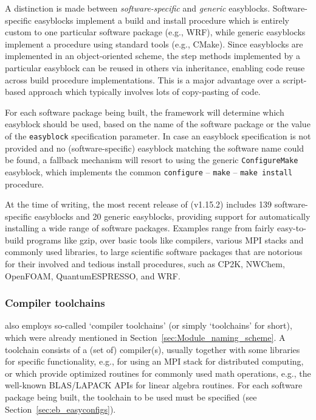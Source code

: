 A distinction is made between \emph{software-specific} and \emph{generic} easyblocks.
Software-specific easyblocks implement a build and install procedure which is
entirely custom to one particular software package (e.g., WRF), while
generic easyblocks implement a procedure using standard tools (e.g., CMake).
Since easyblocks are implemented in an object-oriented scheme,
the step methods implemented by a particular easyblock can be reused in others via
inheritance, enabling code reuse across build procedure implementations.
This is a major advantage over a script-based approach which typically involves
lots of copy-pasting of code.

For each software package being built, the \easybuild{} framework will determine
which easyblock should be used, based on the name of the software package or the
value of the \texttt{\small easyblock} specification parameter. In case an easyblock
specification is not provided and no (software-specific) easyblock matching the
software name could be found, a fallback mechanism will resort to using the generic
\texttt{\small ConfigureMake} easyblock, which implements the common
\texttt{\small configure} -- \texttt{\small make} -- \texttt{\small make install}
procedure.

At the time of writing, the most recent release of \easybuild{} (v1.15.2) includes 139
software-specific easyblocks and 20 generic easyblocks, providing support for
automatically installing a wide range of software packages. Examples range
from fairly easy-to-build programs like gzip, over basic tools like
compilers, various MPI stacks and commonly used libraries, to large scientific
software packages that are notorious for their involved and tedious install
procedures, such as CP2K, NWChem, OpenFOAM, QuantumESPRESSO, and WRF.

\subsubsection{Compiler toolchains}
\label{sec:eb_toolchains}

\easybuild{} also employs so-called `compiler toolchains' (or simply `toolchains'
for short), which were already mentioned in Section~\ref{sec:Module_naming_scheme}.
A toolchain consists of a (set of) compiler(s), usually together with some
libraries for specific functionality, e.g., for using an MPI stack for distributed
computing, or which provide optimized routines for commonly used math operations,
e.g., the well-known BLAS/LAPACK APIs for linear algebra routines. For each software
package being built, the toolchain to be used must be specified
(see Section~\ref{sec:eb_easyconfigs}).

